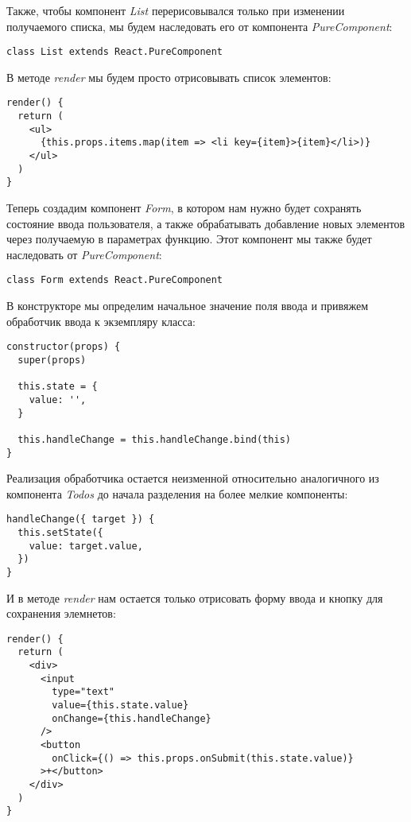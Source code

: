 Также, чтобы компонент \textit{List} перерисовывался только при изменении получаемого списка, мы будем наследовать его от компонента \textit{PureComponent}:

\begin{lstlisting}
class List extends React.PureComponent
\end{lstlisting}

В методе \textit{render} мы будем просто отрисовывать список элементов:

\begin{lstlisting}
render() {
  return (
    <ul>
      {this.props.items.map(item => <li key={item}>{item}</li>)}
    </ul>
  )
}
\end{lstlisting}

Теперь создадим компонент \textit{Form}, в котором нам нужно будет сохранять состояние ввода пользователя, а также обрабатывать добавление новых элементов через получаемую в параметрах функцию. Этот компонент мы также будет наследовать от \textit{PureComponent}:

\begin{lstlisting}
class Form extends React.PureComponent
\end{lstlisting}

В конструкторе мы определим начальное значение поля ввода и привяжем обработчик ввода к экземпляру класса:

\begin{lstlisting}
constructor(props) {
  super(props)
  
  this.state = {
    value: '',
  }
  
  this.handleChange = this.handleChange.bind(this)
}
\end{lstlisting}

Реализация обработчика остается неизменной относительно аналогичного из компонента \textit{Todos} до начала разделения на более мелкие компоненты:

\begin{lstlisting}
handleChange({ target }) {
  this.setState({
    value: target.value,
  })
}
\end{lstlisting}

И в методе \textit{render} нам остается только отрисовать форму ввода и кнопку для сохранения элемнетов:

\begin{lstlisting}
render() {
  return (
    <div>
      <input
        type="text"
        value={this.state.value}
        onChange={this.handleChange}
      />
      <button
        onClick={() => this.props.onSubmit(this.state.value)}
      >+</button>
    </div>
  )
}
\end{lstlisting}

